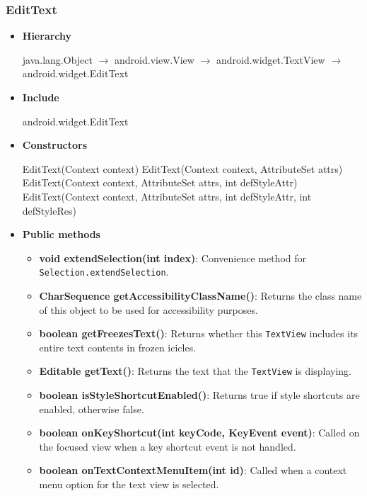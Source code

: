 \documentclass{report}
\begin{document}
    \pagebreak 
    \subsubsection{EditText}
    \begin{itemize}
        \item \textbf{Hierarchy} 
            \begin{center}
                java.lang.Object $\to$	android.view.View $\to$	android.widget.TextView $\to$	android.widget.EditText
            \end{center}
        \item \textbf{Include}
            \bigbreak \noindent 
            \begin{javacode}
                android.widget.EditText
            \end{javacode}
        \item \textbf{Constructors}
            \bigbreak \noindent 
            \begin{javacode}
                EditText(Context context)
                EditText(Context context, AttributeSet attrs)
                EditText(Context context, AttributeSet attrs, int defStyleAttr)
                EditText(Context context, AttributeSet attrs, int defStyleAttr, int defStyleRes)
            \end{javacode}
        \item \textbf{Public methods}
            \begin{itemize}
                \item \textbf{void extendSelection(int index)}: Convenience method for \texttt{Selection.extendSelection}.
                \item \textbf{CharSequence getAccessibilityClassName()}: Returns the class name of this object to be used for accessibility purposes.
                \item \textbf{boolean getFreezesText()}: Returns whether this \texttt{TextView} includes its entire text contents in frozen icicles.
                \item \textbf{Editable getText()}: Returns the text that the \texttt{TextView} is displaying.
                \item \textbf{boolean isStyleShortcutEnabled()}: Returns true if style shortcuts are enabled, otherwise false.
                \item \textbf{boolean onKeyShortcut(int keyCode, KeyEvent event)}: Called on the focused view when a key shortcut event is not handled.
                \item \textbf{boolean onTextContextMenuItem(int id)}: Called when a context menu option for the text view is selected.

\end{itemize}
\end{itemize}
\end{document}
